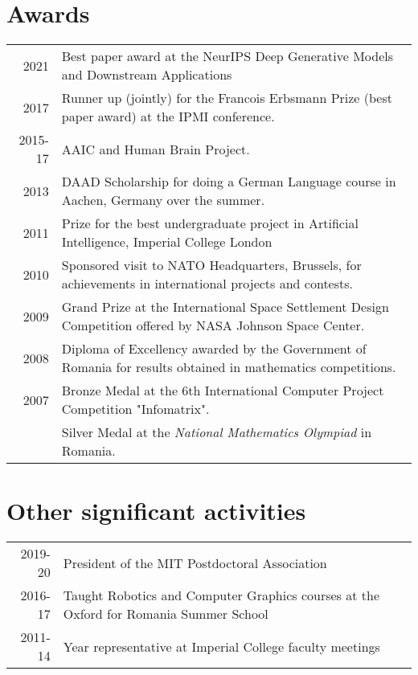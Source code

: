 \documentclass[a4paper,10pt]{article} %
\begin{document}
\section*{Awards}

\begin{tabular}{r|p{15.7cm}}
2021 & Best paper award at the NeurIPS Deep Generative Models and Downstream Applications\\
2017 & Runner up (jointly) for the Francois Erbsmann Prize (best paper award) at the IPMI conference.\\
2015-17 & AAIC and Human Brain Project.\\
2013 & DAAD Scholarship for doing a German Language course in Aachen, Germany over the summer.\\
2011 & Prize for the best undergraduate project in Artificial Intelligence, Imperial College London\\
2010 & Sponsored visit to NATO Headquarters, Brussels, for achievements in international projects and contests.\\
2009 & Grand Prize at the International Space Settlement Design Competition offered by NASA Johnson Space Center.\\
2008 & Diploma of Excellency awarded by the Government of Romania for results obtained in mathematics competitions.\\
2007 & Bronze Medal at the 6th International Computer Project Competition
"Infomatrix".\\
& Silver Medal at the \emph{National Mathematics Olympiad} in Romania.
\end{tabular}

\section*{Other significant activities}
\begin{tabular}{r|p{15cm}}
2019-20 & President of the MIT Postdoctoral Association\\
2016-17 & Taught Robotics and Computer Graphics courses at the Oxford for Romania Summer School\\
2011-14 & Year representative at Imperial College faculty meetings\\
\end{tabular}
\end{document}
